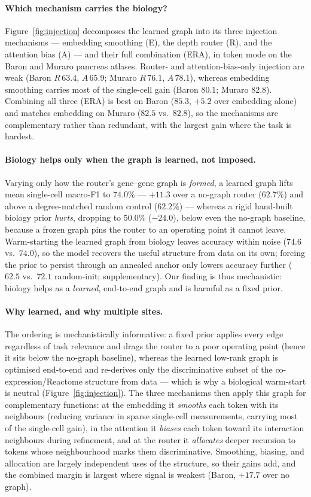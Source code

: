 \documentclass[letterpaper]{article}
\begin{document}
\paragraph{Which mechanism carries the biology?}
Figure~\ref{fig:injection} decomposes the learned graph into its three injection mechanisms ---
embedding smoothing (E), the depth router (R), and the attention bias (A) --- and their full
combination (ERA), in token mode on the Baron and Muraro pancreas atlases. Router- and
attention-bias-only injection are weak (Baron $R\,63.4$, $A\,65.9$; Muraro $R\,76.1$, $A\,78.1$),
whereas embedding smoothing carries most of the single-cell gain (Baron $80.1$; Muraro $82.8$).
Combining all three (ERA) is best on Baron ($85.3$, $+5.2$ over embedding alone) and matches
embedding on Muraro ($82.5$ vs.\ $82.8$), so the mechanisms are complementary rather than
redundant, with the largest gain where the task is hardest.

\paragraph{Biology helps only when the graph is learned, not imposed.}
Varying only how the router's gene--gene graph is \emph{formed}, a learned graph lifts mean
single-cell macro-F1 to $74.0\%$ --- $+11.3$ over a no-graph router ($62.7\%$) and above a
degree-matched random control ($62.2\%$) --- whereas a rigid hand-built biology prior
\emph{hurts}, dropping to $50.0\%$ ($-24.0$), below even the no-graph baseline, because a frozen
graph pins the router to an operating point it cannot leave. Warm-starting the learned graph
from biology leaves accuracy within noise ($74.6$ vs.\ $74.0$), so the model recovers the
useful structure from data on its own; forcing the prior to persist through an annealed anchor
only lowers accuracy further ($62.5$ vs.\ $72.1$ random-init; supplementary). Our finding is
thus mechanistic: biology helps as a \emph{learned}, end-to-end graph and is harmful as a fixed
prior.

\paragraph{Why learned, and why multiple sites.}
The ordering is mechanistically informative: a fixed prior applies every edge regardless of task
relevance and drags the router to a poor operating point (hence it sits below the no-graph
baseline), whereas the learned low-rank graph is optimised end-to-end and re-derives only the
discriminative subset of the co-expression/Reactome structure from data --- which is why a
biological warm-start is neutral (Figure~\ref{fig:injection}). The three mechanisms then apply
this graph for complementary functions: at the embedding it \emph{smooths} each token with its
neighbours (reducing variance in sparse single-cell measurements, carrying most of the single-cell
gain), in the attention it \emph{biases} each token toward its interaction neighbours during
refinement, and at the router it \emph{allocates} deeper recursion to tokens whose neighbourhood
marks them discriminative. Smoothing, biasing, and allocation are largely independent uses of the
structure, so their gains add, and the combined margin is largest where signal is weakest
(Baron, $+17.7$ over no graph).
\end{document}
